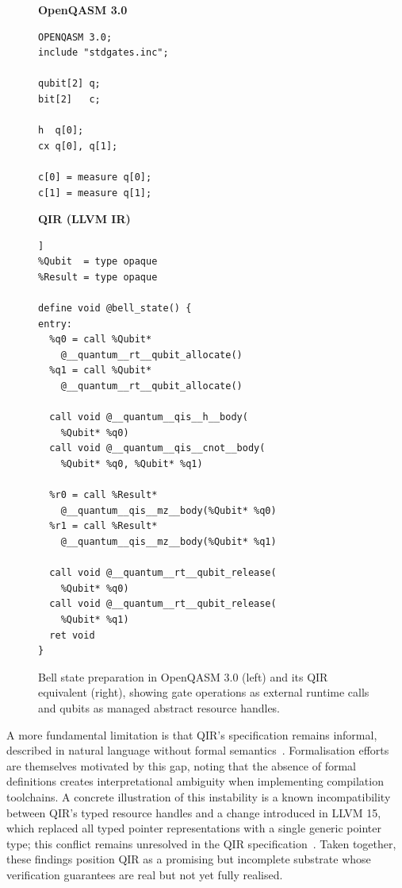 \begin{figure}[htbp]
    \centering
    \begin{minipage}[t]{0.46\textwidth}
        \centering
        \textbf{OpenQASM 3.0}
        \begin{lstlisting}[basicstyle=\ttfamily\scriptsize,
            frame=single,label={lst:lit_rev:qpl:openqasm_to_qir_openqasm}]
OPENQASM 3.0;
include "stdgates.inc";

qubit[2] q;
bit[2]   c;

h  q[0];
cx q[0], q[1];

c[0] = measure q[0];
c[1] = measure q[1];
        \end{lstlisting}
    \end{minipage}
    \hfill
    \begin{minipage}[t]{0.5\textwidth}
        \centering
        \textbf{QIR (LLVM IR)}
        \begin{lstlisting}[basicstyle=\ttfamily\scriptsize,
            frame=single,label={lst:lit_rev:qpl:openqasm_to_qir_qir}]]
%Qubit  = type opaque
%Result = type opaque

define void @bell_state() {
entry:
  %q0 = call %Qubit*
    @__quantum__rt__qubit_allocate()
  %q1 = call %Qubit*
    @__quantum__rt__qubit_allocate()

  call void @__quantum__qis__h__body(
    %Qubit* %q0)
  call void @__quantum__qis__cnot__body(
    %Qubit* %q0, %Qubit* %q1)

  %r0 = call %Result*
    @__quantum__qis__mz__body(%Qubit* %q0)
  %r1 = call %Result*
    @__quantum__qis__mz__body(%Qubit* %q1)

  call void @__quantum__rt__qubit_release(
    %Qubit* %q0)
  call void @__quantum__rt__qubit_release(
    %Qubit* %q1)
  ret void
}
        \end{lstlisting}
    \end{minipage}
    \caption{Bell state preparation in OpenQASM 3.0 (left) and its QIR equivalent
        (right), showing gate operations as external runtime calls and qubits as managed
        abstract resource handles.}
    \label{fig:lit_rev:qpl:openqasm_to_qir}
\end{figure}

A more fundamental limitation is that QIR's specification remains informal, described in natural language without formal semantics~\cite{qirformalization2024}.
Formalisation efforts~\cite{qirformalization2024} are themselves motivated by this gap, noting that the absence of formal definitions creates interpretational ambiguity when implementing compilation toolchains.
A concrete illustration of this instability is a known incompatibility between QIR's typed resource handles and a change introduced in LLVM 15, which replaced all typed pointer representations with a single generic pointer type; this conflict remains unresolved in the QIR specification~\cite{qiralliance_spec}.
Taken together, these findings position QIR as a promising but incomplete substrate whose verification guarantees are real but not yet fully realised.

